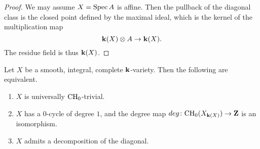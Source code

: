 \begin{proof}
    We may assume $X = \operatorname{Spec} A$ is affine.
    Then the pullback of the diagonal class is the closed point
    defined by the maximal ideal, which is the kernel of
    the multiplication map
    \[ \bbk (X) \otimes A \to \bbk (X). \]
    The residue field is thus $\bbk (X)$.
\end{proof}

\begin{theorem}  \label{thm-2-decomp}
    Let $X$ be a smooth, integral, complete $\bbk$-variety. Then the following are equivalent.
    \begin{enumerate}
        \item \label{itm-thm-2-decomp-1}
            $X$ is universally $\mathrm{CH}_0$-trivial.
        \item \label{itm-thm-2-decomp-2}
            $X$ has a $0$-cycle of degree $1$,
            and the degree map $\deg \: \CH_0 (X_{\bbk (X)}) \to \bbZ$ is an isomorphism.
        \item \label{itm-thm-2-decomp-3}
            $X$ admits a decomposition of the diagonal.
    \end{enumerate}
\end{theorem}

